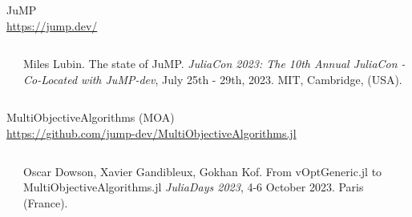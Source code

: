\documentclass[]{beamer}
\begin{document}
\begin{frame}
    
JuMP\vspace{-2mm}\\
    \smallskip
    {\small
    \url{https://jump.dev/}
    }\vspace{0.5mm}\\
    \begin{columns}
      \begin{column}{0.05\textwidth}
      \end{column}
      \begin{column}{0.85\textwidth}
              {\tiny Miles Lubin. The state of JuMP.
              \textit{JuliaCon 2023: The 10th Annual JuliaCon - Co-Located with JuMP-dev}, July 25th - 29th, 2023. MIT, Cambridge, (USA). \vspace{0mm}\\}
      \end{column}
      \end{columns}     
    \medskip

MultiObjectiveAlgorithms (MOA) \vspace{-2mm}   \\
    \smallskip
    {\small
    \url{https://github.com/jump-dev/MultiObjectiveAlgorithms.jl}
    }    \vspace{0.5mm}\\
    
    \begin{columns}
      \begin{column}{0.05\textwidth}
      \end{column}
      \begin{column}{0.85\textwidth}
              {\tiny Oscar Dowson, Xavier Gandibleux, Gokhan Kof. From vOptGeneric.jl to MultiObjectiveAlgorithms.jl \quad
              \textit{JuliaDays 2023}, 4-6 October 2023. Paris (France). \vspace{0mm}\\}
      \end{column}
      \end{columns}    
      

\end{frame}


% 
%
\end{document}
